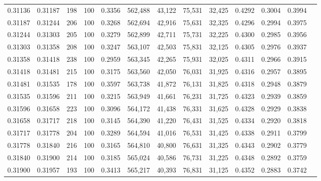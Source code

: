 \begin{tabular}{rrrrrrrrrrrrr}
0.31136 & 0.31187 &   198 & 100 &                                     0.3356 & 562,488 &  43,122 &  75,531 &  32,425 & 0.4292 & 0.3004 & 0.3994 \\
0.31187 & 0.31244 &   206 & 100 &                                     0.3268 & 562,694 &  42,916 &  75,631 &  32,325 & 0.4296 & 0.2994 & 0.3975 \\
0.31244 & 0.31303 &   205 & 100 &                                     0.3279 & 562,899 &  42,711 &  75,731 &  32,225 & 0.4300 & 0.2985 & 0.3956 \\
0.31303 & 0.31358 &   208 & 100 &                                     0.3247 & 563,107 &  42,503 &  75,831 &  32,125 & 0.4305 & 0.2976 & 0.3937 \\
0.31358 & 0.31418 &   238 & 100 &                                     0.2959 & 563,345 &  42,265 &  75,931 &  32,025 & 0.4311 & 0.2966 & 0.3915 \\
0.31418 & 0.31481 &   215 & 100 &                                     0.3175 & 563,560 &  42,050 &  76,031 &  31,925 & 0.4316 & 0.2957 & 0.3895 \\
0.31481 & 0.31535 &   178 & 100 &                                     0.3597 & 563,738 &  41,872 &  76,131 &  31,825 & 0.4318 & 0.2948 & 0.3879 \\
0.31535 & 0.31596 &   211 & 100 &                                     0.3215 & 563,949 &  41,661 &  76,231 &  31,725 & 0.4323 & 0.2939 & 0.3859 \\
0.31596 & 0.31658 &   223 & 100 &                                     0.3096 & 564,172 &  41,438 &  76,331 &  31,625 & 0.4328 & 0.2929 & 0.3838 \\
0.31658 & 0.31717 &   218 & 100 &                                     0.3145 & 564,390 &  41,220 &  76,431 &  31,525 & 0.4334 & 0.2920 & 0.3818 \\
0.31717 & 0.31778 &   204 & 100 &                                     0.3289 & 564,594 &  41,016 &  76,531 &  31,425 & 0.4338 & 0.2911 & 0.3799 \\
0.31778 & 0.31840 &   216 & 100 &                                     0.3165 & 564,810 &  40,800 &  76,631 &  31,325 & 0.4343 & 0.2902 & 0.3779 \\
0.31840 & 0.31900 &   214 & 100 &                                     0.3185 & 565,024 &  40,586 &  76,731 &  31,225 & 0.4348 & 0.2892 & 0.3759 \\
0.31900 & 0.31957 &   193 & 100 &                                     0.3413 & 565,217 &  40,393 &  76,831 &  31,125 & 0.4352 & 0.2883 & 0.3742 \\

\end{tabular}
